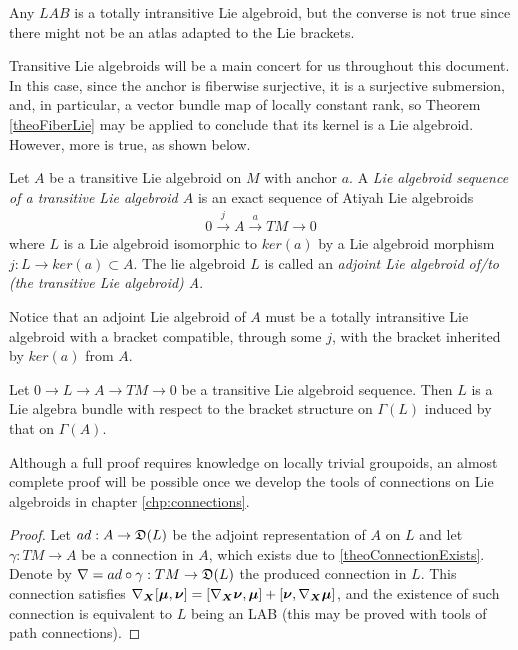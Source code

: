 \begin{remark}
Any $LAB$ is a totally intransitive Lie algebroid, but the converse is not true since there might not be an atlas adapted to the Lie brackets.
\end{remark}

Transitive Lie algebroids will be a main concert for us throughout this document. In this case, since the anchor is fiberwise surjective, it is a surjective submersion, and, in particular, a vector bundle map of locally constant rank, so Theorem \ref{theoFiberLie} may be applied to conclude that its kernel is a Lie algebroid. However, more is true, as shown below.

\begin{definition}\label{transitiveSequence}
Let $A$ be a transitive Lie algebroid on $M$ with anchor $a$. A \emph{Lie algebroid sequence of a transitive Lie algebroid $A$} is an exact sequence of Atiyah Lie algebroids
\begin{align}
    0 \xrightarrow{j} A \xrightarrow{a} TM \to 0
\end{align}
where $L$ is a Lie algebroid isomorphic to $ker(a)$ by a Lie algebroid morphism $j:L \to ker(a) \subset A$. The lie algebroid $L$ is called an \emph{adjoint Lie algebroid of/to (the transitive Lie algebroid) A}.
\end{definition}
Notice that an adjoint Lie algebroid of $A$ must be a totally intransitive Lie algebroid with a bracket compatible, through some $j$, with the bracket inherited by $ker(a)$ from $A$.

\begin{theorem}\label{theoAdjointLAB} %
Let $0 \to L \to A \to  TM \to 0$ be a transitive Lie algebroid sequence. Then $L$ is a Lie algebra bundle with respect to the bracket structure on $\Gamma(L)$ induced by that on $\Gamma(A)$.
\end{theorem}
Although a full proof requires knowledge on locally trivial groupoids, an almost complete proof will be possible once we develop the tools of connections on Lie algebroids in chapter \ref{chp:connections}. 
\begin{proof}
Let $ad: A \to \mathfrak{D}(L)$ be the adjoint representation of $A$ on $L$ and let $\gamma: TM \to A$ be a connection in $A$, which exists due to \ref{theoConnectionExists}. Denote by $\nabla = ad \circ \gamma : TM \to \mathfrak{D}(L)$ the produced connection in $L$. This connection satisfies $\nabla_{\bm{X}}[\bm{\mu}, \bm{\nu}] = [\nabla_{\bm{X}} \bm{\nu}, \bm{\mu}] + [\bm{\nu}, \nabla_{\bm{X}} \bm{\mu}]$, and the existence of such connection is equivalent to $L$ being an LAB (this may be proved with tools of path connections).
\end{proof}


